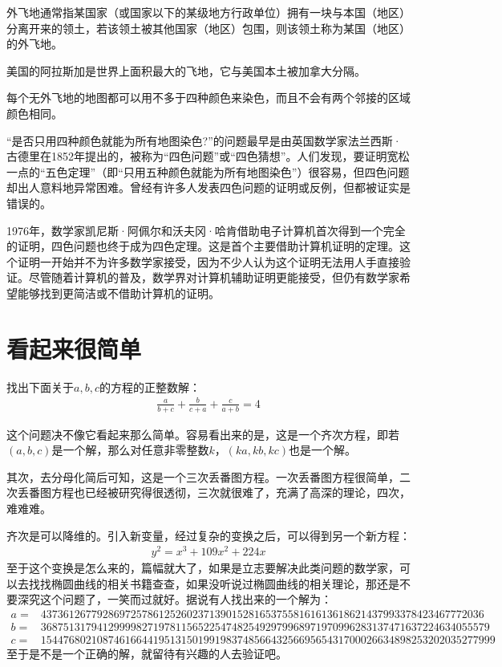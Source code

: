 \begin{definition}
  外飞地通常指某国家（或国家以下的某级地方行政单位）拥有一块与本国（地区）分离开来的领土，若该领土被其他国家（地区）包围，则该领土称为某国（地区）的外飞地。
\end{definition}

美国的阿拉斯加是世界上面积最大的飞地，它与美国本土被加拿大分隔。

\begin{example}
  每个无外飞地的地图都可以用不多于四种颜色来染色，而且不会有两个邻接的区域颜色相同。
\end{example}

“是否只用四种颜色就能为所有地图染色?”的问题最早是由英国数学家法兰西斯·古德里在1852年提出的，被称为“四色问题”或“四色猜想”。人们发现，要证明宽松一点的“五色定理”（即“只用五种颜色就能为所有地图染色”）很容易，但四色问题却出人意料地异常困难。曾经有许多人发表四色问题的证明或反例，但都被证实是错误的。

1976年，数学家凯尼斯·阿佩尔和沃夫冈·哈肯借助电子计算机首次得到一个完全的证明，四色问题也终于成为四色定理。这是首个主要借助计算机证明的定理。这个证明一开始并不为许多数学家接受，因为不少人认为这个证明无法用人手直接验证。尽管随着计算机的普及，数学界对计算机辅助证明更能接受，但仍有数学家希望能够找到更简洁或不借助计算机的证明。

\section{看起来很简单}
\label{sec:looks-simple}

\begin{example}
  找出下面关于$a,b,c$的方程的正整数解：
  \begin{align*}
    \frac{a}{b+c}+\frac{b}{c+a}+\frac{c}{a+b}=4
  \end{align*}
\end{example}
这个问题决不像它看起来那么简单。容易看出来的是，这是一个齐次方程，即若$(a,b,c)$是一个解，那么对任意非零整数$k$，$(ka, kb, kc)$也是一个解。

其次，去分母化简后可知，这是一个三次丢番图方程。一次丢番图方程很简单，二次丢番图方程也已经被研究得很透彻，三次就很难了，充满了高深的理论，四次，难难难。

齐次是可以降维的。引入新变量，经过复杂的变换之后，可以得到另一个新方程：
\begin{align*}
  y^2=x^3+109x^2+224x
\end{align*}
至于这个变换是怎么来的，篇幅就大了，如果是立志要解决此类问题的数学家，可以去找找椭圆曲线的相关书籍查查，如果没听说过椭圆曲线的相关理论，那还是不要深究这个问题了，一笑而过就好。据说有人找出来的一个解为：
{\tiny
\begin{align*}
  a={}&4373612677928697257861252602371390152816537558161613618621437993378423467772036\\
  b={}&36875131794129999827197811565225474825492979968971970996283137471637224634055579\\
  c={}&154476802108746166441951315019919837485664325669565431700026634898253202035277999  
\end{align*}
}
至于是不是一个正确的解，就留待有兴趣的人去验证吧。

